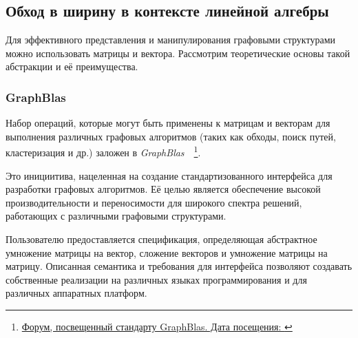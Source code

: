 \subsection{Обход в ширину в контексте линейной алгебры}
Для эффективного представления и манипулирования графовыми структурами можно использовать матрицы и вектора. Рассмотрим теоретические основы такой  абстракции и её преимущества.



\subsubsection*{GraphBlas}
Набор операций, которые могут быть применены к матрицам и векторам для выполнения различных графовых алгоритмов (таких как обходы, поиск путей, кластеризация и др.) заложен в \textit{GraphBlas}~\cite{gb_math}~\footnote{\href{https://graphblas.org/}{Форум, посвещенный стандарту GraphBlas. Дата посещения: }}.

Это инициитива, нацеленная на создание стандартизованного интерфейса для разработки графовых алгоритмов. Её целью является обеспечение высокой производительности и переносимости для широкого спектра решений, работающих с различными графовыми структурами.

Пользователю предоставляется спецификация, определяющая абстрактное умножение матрицы на вектор, сложение векторов и умножение матрицы на матрицу. Описанная семантика и требования для интерфейса позволяют создавать собственные реализации на различных языках программирования и для различных аппаратных платформ. 



